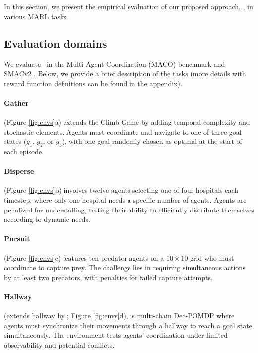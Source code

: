 
In this section, we present the empirical evaluation of our proposed approach, \algoabb, in various MARL tasks. 

\subsection{Evaluation domains} 

We evaluate \algoabb\ in the Multi-Agent Coordination (MACO) benchmark \cite{wang2022contextaware} and SMACv2 \cite{ellis2023smacv}. Below, we provide a brief description of the tasks (more details with reward function definitions can be found in the appendix). 

\paragraph{Gather} (Figure \ref{fig:envs}a) extends the Climb Game \cite{wei2016lenient} by adding temporal complexity and stochastic elements. Agents must coordinate and navigate to one of three goal states (\( g_1 \), \( g_2 \), or \( g_3 \)), with one goal randomly chosen as optimal at the start of each episode. 

\paragraph{Disperse} (Figure \ref{fig:envs}b) involves twelve agents selecting one of four hospitals each timestep, where only one hospital needs a specific number of agents. Agents are penalized for understaffing, testing their ability to efficiently distribute themselves according to dynamic needs.

\paragraph{Pursuit} (Figure \ref{fig:envs}c) features ten predator agents on a $10 \times 10$ grid who must coordinate to capture prey. The challenge lies in requiring simultaneous actions by at least two predators, with penalties for failed capture attempts.

\paragraph{Hallway} (extends hallway by \cite{wang2019learning}; Figure \ref{fig:envs}d), is multi-chain Dec-POMDP where agents must synchronize their movements through a hallway to reach a goal state simultaneously. The environment tests agents' coordination under limited observability and potential conflicts.

